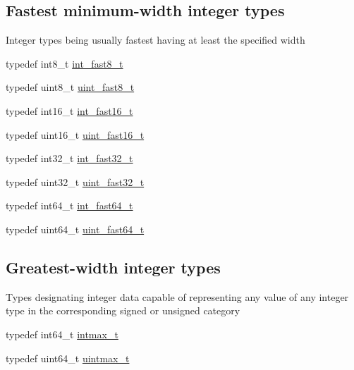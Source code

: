 \subsection*{Fastest minimum-\/width integer types}
\label{_amgrpb4a1523ab4c0d1159e7f4c2cec817601}%
Integer types being usually fastest having at least the specified width \begin{DoxyCompactItemize}
\item 
typedef int8\+\_\+t \hyperlink{group__avr__stdint_ga880ed9ceb8621521452c81d03bd08cfb}{int\+\_\+fast8\+\_\+t}
\item 
typedef uint8\+\_\+t \hyperlink{group__avr__stdint_gad0fca8b15c218d2c687f8c373a71d228}{uint\+\_\+fast8\+\_\+t}
\item 
typedef int16\+\_\+t \hyperlink{group__avr__stdint_ga9b7386d4af0e20ee32296d9a158c9f3a}{int\+\_\+fast16\+\_\+t}
\item 
typedef uint16\+\_\+t \hyperlink{group__avr__stdint_ga6ed085329b153773ff76afa0702cf897}{uint\+\_\+fast16\+\_\+t}
\item 
typedef int32\+\_\+t \hyperlink{group__avr__stdint_ga920d4b149da0252281b6762375fb644a}{int\+\_\+fast32\+\_\+t}
\item 
typedef uint32\+\_\+t \hyperlink{group__avr__stdint_ga8f075c759c74e109e8184306c663809d}{uint\+\_\+fast32\+\_\+t}
\item 
typedef int64\+\_\+t \hyperlink{group__avr__stdint_gafd072b9a94c14417246175f6442422ae}{int\+\_\+fast64\+\_\+t}
\item 
typedef uint64\+\_\+t \hyperlink{group__avr__stdint_ga6fd055dddb7d91fab0635146851af8d5}{uint\+\_\+fast64\+\_\+t}
\end{DoxyCompactItemize}
\subsection*{Greatest-\/width integer types}
\label{_amgrpc8e13fb8ae6d63225094a9992730a810}%
Types designating integer data capable of representing any value of any integer type in the corresponding signed or unsigned category \begin{DoxyCompactItemize}
\item 
typedef int64\+\_\+t \hyperlink{group__avr__stdint_ga036cd61bb4b30bb510b9538af4cebd1d}{intmax\+\_\+t}
\item 
typedef uint64\+\_\+t \hyperlink{group__avr__stdint_ga2ba5f6c0633401558d277b2c0e4f758d}{uintmax\+\_\+t}
\end{DoxyCompactItemize}
